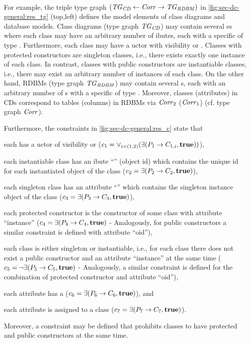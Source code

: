 \paragraph*{}
For example, the triple type graph $(\mathit{TG}_\mathit{CD} \gets \mathit{Corr} \to \mathit{TG}_\mathit{RDBM})$ in \cref{fig:sec-dc-general:res_tg} (top,left) defines the model elements of class diagrams and database models.
Class diagrams (type graph $\mathit{TG}_\mathit{CD}$) may contain several es where each class may have an arbitrary number of ibutes, each with a specific  of type .
Furthermore, each class may have a uctor with visibility  or .
Classes with protected constructors are singleton classes, i.e., there exists exactly one instance of each class.
In contrast, classes with public constructors are instantiable classes, i.e., there may exist an arbitrary number of instances of each class.
On the other hand, RDBMs (type graph $\mathit{TG}_\mathit{RDBM}$) may contain several s, each with an arbitrary number of s with a specific  of type .
Moreover, classes (attributes) in CDs correspond to tables (columns) in RDBMs via $\mathit{Corr}_2$ ($\mathit{Corr}_1$) (cf. type graph $\mathit{Corr}$).

Furthermore, the constraints in \cref{fig:sec-dc-general:res_c} state that
\begin{enumerate*}
\item each  has a uctor of visibility  or  ($c_1=\vee_{i=(1,2)}(\exists(P_1 \to C_{1,i},\textbf{true}))$),
\item each instantiable class has an ibute ``'' (object id) which contains the unique id for each instantiated object of the class ($c_2=\exists(P_2 \to C_2,\textbf{true})$),
\item each singleton class has an attribute ``'' which contains the singleton instance object of the class ($c_3=\exists(P_3 \to C_3,\textbf{true})$),
\item each protected constructor is the constructor of some class with attribute ``instance'' ($c_4=\exists(P_4 \to C_4,\textbf{true})$ - Analogously, for public constructors a similar constraint is defined with attribute ``oid''),
\item each class is either singleton or instantiable, i.e., for each class there does not exist a public constructor and an attribute ``instance'' at the same time ($c_5=\neg\exists(P_5 \to C_5,\textbf{true})$ - Analogously, a similar constraint is defined for the combination of protected constructor and attribute ``oid''),
\item each attribute has a  ($c_6=\exists(P_6 \to C_6,\textbf{true})$), and
\item each attribute is assigned to a class ($c_7=\exists(P_7 \to C_7,\textbf{true})$).
\end{enumerate*}
Moreover, a constraint may be defined that prohibits classes to have protected and public constructors at the same time.

